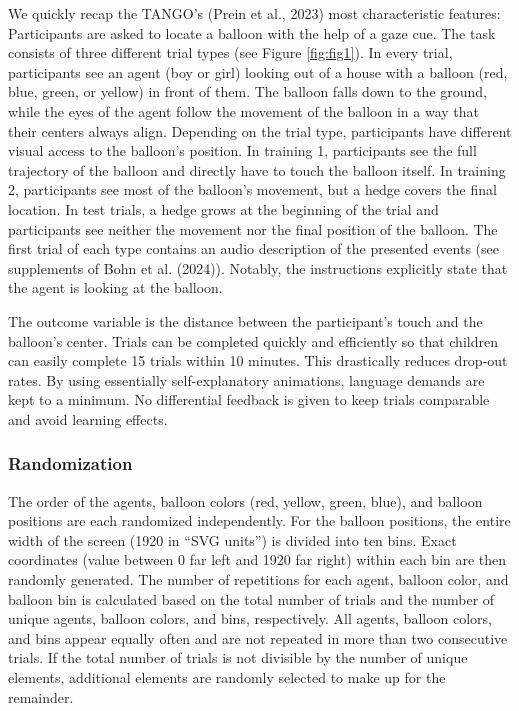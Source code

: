 \documentclass[
  man,floatsintext]{apa7}
\begin{document}
We quickly recap the TANGO's (Prein et al., 2023) most characteristic features: Participants are asked to locate a balloon with the help of a gaze cue.
The task consists of three different trial types (see Figure \ref{fig:fig1}).
In every trial, participants see an agent (boy or girl) looking out of a house with a balloon (red, blue, green, or yellow) in front of them.
The balloon falls down to the ground, while the eyes of the agent follow the movement of the balloon in a way that their centers always align.
Depending on the trial type, participants have different visual access to the balloon's position.
In training 1, participants see the full trajectory of the balloon and directly have to touch the balloon itself.
In training 2, participants see most of the balloon's movement, but a hedge covers the final location.
In test trials, a hedge grows at the beginning of the trial and participants see neither the movement nor the final position of the balloon.
The first trial of each type contains an audio description of the presented events (see supplements of Bohn et al. (2024)).
Notably, the instructions explicitly state that the agent is looking at the balloon.

The outcome variable is the distance between the participant's touch and the balloon's center.
Trials can be completed quickly and efficiently so that children can easily complete 15 trials within 10 minutes.
This drastically reduces drop-out rates.
By using essentially self-explanatory animations, language demands are kept to a minimum.
No differential feedback is given to keep trials comparable and avoid learning effects.

\subsubsection{Randomization}\label{randomization}

The order of the agents, balloon colors (red, yellow, green, blue), and balloon positions are each randomized independently.
For the balloon positions, the entire width of the screen (1920 in ``SVG units'') is divided into ten bins.
Exact coordinates (value between 0 far left and 1920 far right) within each bin are then randomly generated.
The number of repetitions for each agent, balloon color, and balloon bin is calculated based on the total number of trials and the number of unique agents, balloon colors, and bins, respectively.
All agents, balloon colors, and bins appear equally often and are not repeated in more than two consecutive trials.
If the total number of trials is not divisible by the number of unique elements, additional elements are randomly selected to make up for the remainder.
\end{document}
